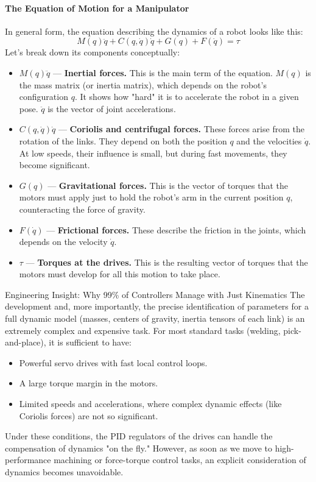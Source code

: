 \paragraph{The Equation of Motion for a Manipulator}
In general form, the equation describing the dynamics of a robot looks like this:
$$ M(q)\ddot{q} + C(q, \dot{q})\dot{q} + G(q) + F(\dot{q}) = \tau $$
Let's break down its components conceptually:
\begin{itemize}
    \item $M(q)\ddot{q}$ — \textbf{Inertial forces.} This is the main term of the equation. $M(q)$ is the mass matrix (or inertia matrix), which depends on the robot's configuration $q$. It shows how "hard" it is to accelerate the robot in a given pose. $\ddot{q}$ is the vector of joint accelerations.
    \item $C(q, \dot{q})\dot{q}$ — \textbf{Coriolis and centrifugal forces.} These forces arise from the rotation of the links. They depend on both the position $q$ and the velocities $\dot{q}$. At low speeds, their influence is small, but during fast movements, they become significant.
    \item $G(q)$ — \textbf{Gravitational forces.} This is the vector of torques that the motors must apply just to hold the robot's arm in the current position $q$, counteracting the force of gravity.
    \item $F(\dot{q})$ — \textbf{Frictional forces.} These describe the friction in the joints, which depends on the velocity $\dot{q}$.
    \item $\tau$ — \textbf{Torques at the drives.} This is the resulting vector of torques that the motors must develop for all this motion to take place.
\end{itemize}

\begin{tipbox}{Engineering Insight: Why 99\% of Controllers Manage with Just Kinematics}
The development and, more importantly, the precise identification of parameters for a full dynamic model (masses, centers of gravity, inertia tensors of each link) is an extremely complex and expensive task. For most standard tasks (welding, pick-and-place), it is sufficient to have:
\begin{itemize}
    \item Powerful servo drives with fast local control loops.
    \item A large torque margin in the motors.
    \item Limited speeds and accelerations, where complex dynamic effects (like Coriolis forces) are not so significant.
\end{itemize}
Under these conditions, the PID regulators of the drives can handle the compensation of dynamics "on the fly." However, as soon as we move to high-performance machining or force-torque control tasks, an explicit consideration of dynamics becomes unavoidable.
\end{tipbox}

